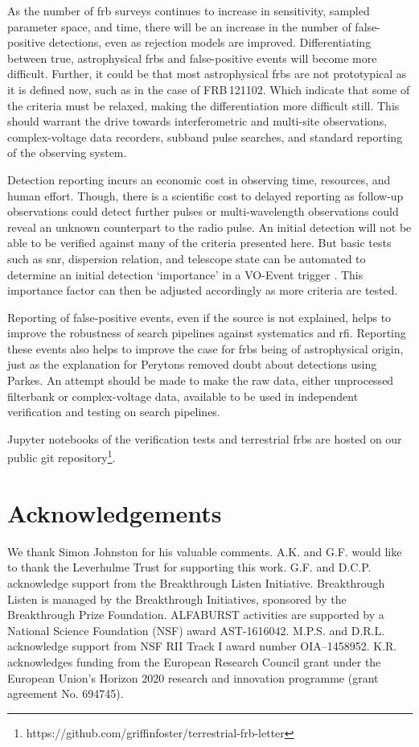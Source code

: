 \documentclass[a4paper,fleqn,usenatbib]{mnras}
\begin{document}
As the number of \gls{frb} surveys continues to increase in sensitivity, sampled
parameter space, and time, there will be an increase in the number of
false-positive detections, even as rejection models are improved.
Differentiating between true, astrophysical \glspl{frb} and false-positive
events will become more difficult.  Further, it could be that most astrophysical
\glspl{frb} are not prototypical as it is defined now, such as in the case of
FRB\,121102. Which indicate that some of the criteria must be relaxed,
making the differentiation more difficult still.  This should warrant the drive
towards interferometric and multi-site observations, complex-voltage data
recorders, subband pulse searches, and standard reporting of the observing
system.

Detection reporting incurs an economic cost in observing time, resources, and
human effort. Though, there is a scientific cost to delayed reporting as
follow-up observations could detect further pulses or multi-wavelength
observations could reveal an unknown counterpart to the radio pulse. An initial
detection will not be able to be verified against many of the criteria presented
here. But basic tests such as \gls{snr}, dispersion relation, and telescope
state can be automated to determine an initial detection `importance' in a
VO-Event trigger \citep{2017arXiv171008155P}. This importance factor can then be
adjusted accordingly as more criteria are tested.

Reporting of false-positive events, even if the source is not explained, helps
to improve the robustness of search pipelines against systematics and \gls{rfi}.
Reporting these events also helps to improve the case for \glspl{frb} being of
astrophysical origin, just as the explanation for Perytons
\citep{2015MNRAS.451.3933P} removed doubt about detections using Parkes. An
attempt should be made to make the raw data, either unprocessed filterbank or
complex-voltage data, available to be used in independent verification and
testing on search pipelines.

Jupyter notebooks of the verification tests and terrestrial \glspl{frb} are
hosted on our public git
repository\footnote{https://github.com/griffinfoster/terrestrial-frb-letter}.

\section*{Acknowledgements}

We thank Simon Johnston for his valuable comments.  A.K. and G.F. would like to
thank the Leverhulme Trust for supporting this work.  G.F. and D.C.P.
acknowledge support from the Breakthrough Listen Initiative.  Breakthrough
Listen is managed by the Breakthrough Initiatives, sponsored by the Breakthrough
Prize Foundation.  ALFABURST activities are supported by a National Science
Foundation (NSF) award AST-1616042. M.P.S. and D.R.L. acknowledge support from
NSF RII Track I award number OIA--1458952. K.R. acknowledges funding from the
European Research Council grant under the European Union's Horizon 2020 research
and innovation programme (grant agreement No. 694745).


 

\bsp	%
\label{lastpage}
\end{document}
